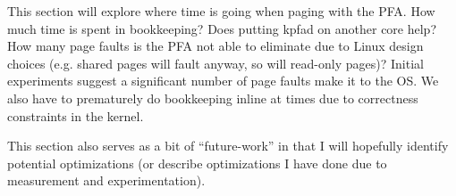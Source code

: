 This section will explore where time is going when paging with the PFA. How much time is spent in bookkeeping? Does putting kpfad on another core help? How many page faults is the PFA not able to eliminate due to Linux design choices (e.g. shared pages will fault anyway, so will read-only pages)? Initial experiments suggest a significant number of page faults make it to the OS. We also have to prematurely do bookkeeping inline at times due to correctness constraints in the kernel.

This section also serves as a bit of ``future-work'' in that I will hopefully identify potential optimizations (or describe optimizations I have done due to measurement and experimentation).